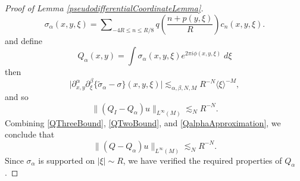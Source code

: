 \begin{proof} [Proof of Lemma \ref{pseudodifferentialCoordinateLemma}]
    \begin{equation} \sigma_\alpha(x,y,\xi) = \sum\nolimits_{-4R \leq n \leq R/8} q \left( \frac{n + p(y,\xi)}{R} \right) c_n(x,y,\xi). \end{equation}
    and define
    \begin{equation} Q_\alpha(x,y) = \int \sigma_\alpha(x,y,\xi) e^{2 \pi i \phi(x,y,\xi)}\; d\xi \end{equation}
    then
    \begin{equation} \Big|\partial_{x,y}^\alpha \partial_\xi^\beta \big\{ \tilde{\sigma}_\alpha - \sigma \big\}(x,y,\xi) \Big| \lesssim_{\alpha,\beta,N,M} R^{-N} \langle \xi \rangle^{-M}, \end{equation}
    and so
    \begin{equation} \label{QalphaApproximation}
        \| ( Q_I - Q_\alpha ) u \|_{L^\infty(M)} \lesssim_N R^{-N}.
    \end{equation}
    Combining \eqref{QThreeBound}, \eqref{QTwoBound}, and \eqref{QalphaApproximation}, we conclude that
    \begin{equation} \label{QApproximationTheorem}
        \| (Q - Q_\alpha) u \|_{L^\infty(M)} \lesssim_N R^{-N}.
    \end{equation}
    Since $\sigma_\alpha$ is supported on $|\xi| \sim R$, we have verified the required properties of $Q_\alpha$.


\end{proof}
